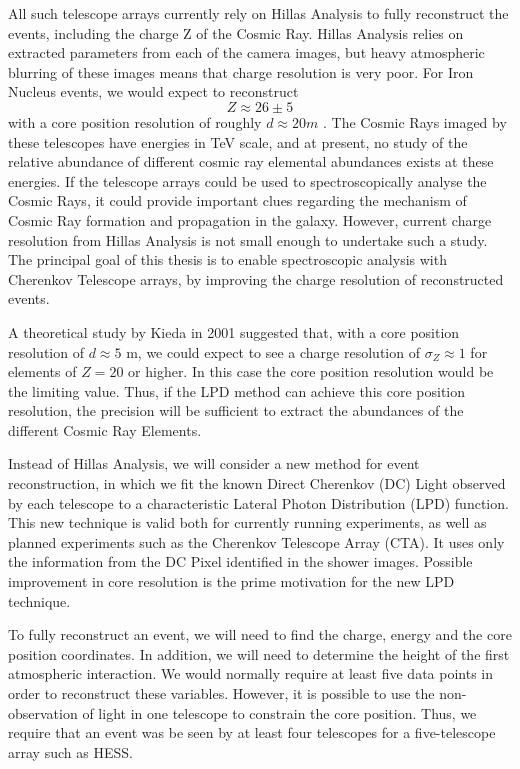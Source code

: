 \documentclass[11pt]{article}
\begin{document}
All such telescope arrays currently rely on Hillas Analysis to fully reconstruct the events, including the  charge Z of the Cosmic Ray. Hillas Analysis relies on extracted parameters from each of the camera images, but heavy atmospheric blurring of these images means that charge resolution is very poor. For Iron Nucleus events, we would expect to reconstruct \[Z \approx 26 \pm 5 \] with a core position resolution of roughly $d \approx 20 m $ \cite{hess07}. The Cosmic Rays imaged by these telescopes have energies in TeV scale, and at present, no study of the relative abundance of different cosmic ray elemental abundances exists at these energies. If the telescope arrays could be used to spectroscopically analyse the Cosmic Rays, it could provide important clues regarding the mechanism of Cosmic Ray formation and propagation in the galaxy. However, current charge resolution from Hillas Analysis is not small enough to undertake such a study. The principal goal of this thesis is to enable spectroscopic analysis with Cherenkov Telescope arrays, by improving the charge resolution of reconstructed events.

A theoretical study by Kieda in 2001 \cite{kieda01} suggested that, with a core position resolution of $d \approx 5 $ m, we could expect to see a charge resolution of $ \sigma_{Z} \approx 1 $ for elements of $Z = 20$ or higher. In this case the core position resolution would be the limiting value. Thus, if the LPD method can achieve this core position resolution, the precision will be sufficient to extract the abundances of the different Cosmic Ray Elements. 

Instead of Hillas Analysis, we will consider a new method for event reconstruction, in which we fit the known Direct Cherenkov (DC) Light observed by each telescope to a characteristic Lateral Photon Distribution (LPD) function. This new technique is valid both for currently running experiments, as well as planned experiments such as the Cherenkov Telescope Array (CTA). It uses only the information from the DC Pixel identified in the shower images. Possible improvement in core resolution is the prime motivation for the new LPD technique.

To fully reconstruct an event, we will need to find the charge, energy and the core position coordinates. In addition, we will need to determine the height of the first atmospheric interaction. We would normally require at least five data points in order to reconstruct these variables. However, it is possible to use the non-observation of light in one telescope to constrain the core position. Thus, we require that an event was be seen by at least four telescopes for a five-telescope array such as HESS. 
\end{document}
